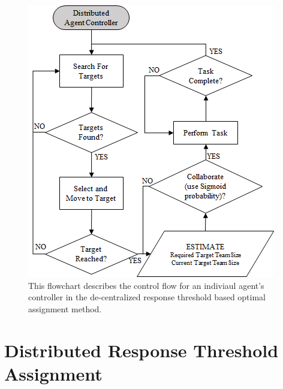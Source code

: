 \documentclass[defaultstyle,12pt]{thesis}
\begin{document}
\begin{figure}[!ht]
\centering\includegraphics[width=.5\columnwidth]{../assets/DistributedController.png}
\centering\caption{This flowchart describes the control flow for an indiviaul agent's controller in the de-centralized response threshold based optimal assignment method.}\label{fig:distcontrol}
\end{figure}

\section{Distributed Response Threshold Assignment}
\end{document}
